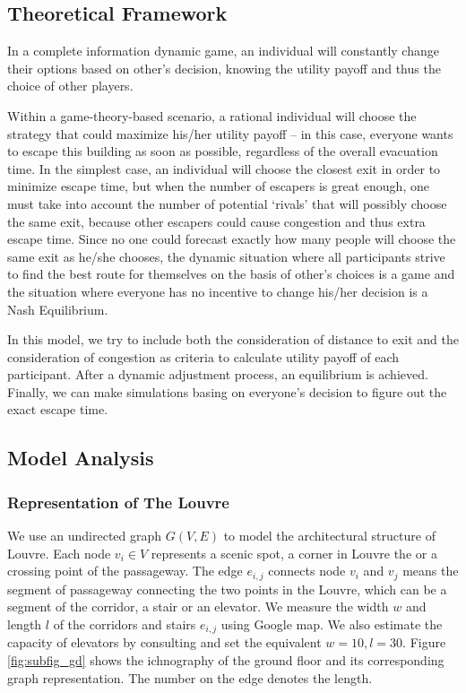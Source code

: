 \documentclass{mcmthesis}
\begin{document}
	
	\subsection{Theoretical Framework}
	In a complete information dynamic game, an individual will constantly change their options based on other’s decision, knowing the utility payoff and thus the choice of other players. 
	
	Within a game-theory-based scenario, a rational individual will choose the strategy that could maximize his/her utility payoff – in this case, everyone wants to escape this building as soon as possible, regardless of the overall evacuation time. In the simplest case, an individual will choose the closest exit in order to minimize escape time, but when the number of escapers is great enough, one must take into account the number of potential ‘rivals’ that will possibly choose the same exit, because other escapers could cause congestion and thus extra escape time. Since no one could forecast exactly how many people will choose the same exit as he/she chooses, the dynamic situation where all participants strive to find the best route for themselves on the basis of other’s choices is a game and the situation where everyone has no incentive to change his/her decision is a Nash Equilibrium.  
	
	
	In this model, we try to include both the consideration of distance to exit and the consideration of congestion as criteria to calculate utility payoff of each participant. After a dynamic adjustment process, an equilibrium is achieved. Finally, we can make simulations basing on everyone's decision to figure out the exact escape time.
	
	\subsection{Model Analysis}
	\subsubsection{Representation of The Louvre}
	
	We use an undirected graph $G(V,E)$ to model the architectural structure of Louvre. Each node $v_i \in V$ represents a scenic spot, a corner in Louvre the or a crossing point of the passageway. The edge $e_{i,j}$ connects node $v_i$ and $v_j$ means the segment of passageway connecting the two points in the Louvre, which can be a segment of the corridor, a stair or an elevator. We measure the width $w$ and length $l$ of the corridors and stairs $e_{i,j}$ using Google map. We also estimate the capacity of elevators by consulting \cite{xu2009staircase} and set the equivalent $w = 10, l = 30$.  Figure \ref{fig:subfig_gd} shows the ichnography of the ground floor and its corresponding graph representation. The number on the edge denotes the length.
	
\end{document}
